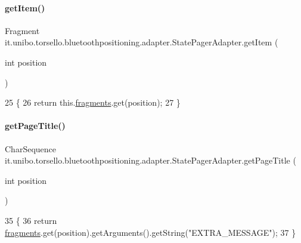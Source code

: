 \paragraph{\texorpdfstring{get\+Item()}{getItem()}}
{\footnotesize\ttfamily Fragment it.\+unibo.\+torsello.\+bluetoothpositioning.\+adapter.\+State\+Pager\+Adapter.\+get\+Item (\begin{DoxyParamCaption}\item[{int}]{position }\end{DoxyParamCaption})}


\begin{DoxyCode}
25                                           \{
26         \textcolor{keywordflow}{return} this.\hyperlink{classit_1_1unibo_1_1torsello_1_1bluetoothpositioning_1_1adapter_1_1StatePagerAdapter_a6d30ff8266b65b268d46d03eb30da1db_a6d30ff8266b65b268d46d03eb30da1db}{fragments}.get(position);
27     \}
\end{DoxyCode}
\hypertarget{classit_1_1unibo_1_1torsello_1_1bluetoothpositioning_1_1adapter_1_1StatePagerAdapter_a4b870f525968be40d114258681e2ddc2_a4b870f525968be40d114258681e2ddc2}{}\label{classit_1_1unibo_1_1torsello_1_1bluetoothpositioning_1_1adapter_1_1StatePagerAdapter_a4b870f525968be40d114258681e2ddc2_a4b870f525968be40d114258681e2ddc2} 
\paragraph{\texorpdfstring{get\+Page\+Title()}{getPageTitle()}}
{\footnotesize\ttfamily Char\+Sequence it.\+unibo.\+torsello.\+bluetoothpositioning.\+adapter.\+State\+Pager\+Adapter.\+get\+Page\+Title (\begin{DoxyParamCaption}\item[{int}]{position }\end{DoxyParamCaption})}


\begin{DoxyCode}
35                                                    \{
36         \textcolor{keywordflow}{return} \hyperlink{classit_1_1unibo_1_1torsello_1_1bluetoothpositioning_1_1adapter_1_1StatePagerAdapter_a6d30ff8266b65b268d46d03eb30da1db_a6d30ff8266b65b268d46d03eb30da1db}{fragments}.get(position).getArguments().getString(\textcolor{stringliteral}{"EXTRA\_MESSAGE"});
37     \}
\end{DoxyCode}


